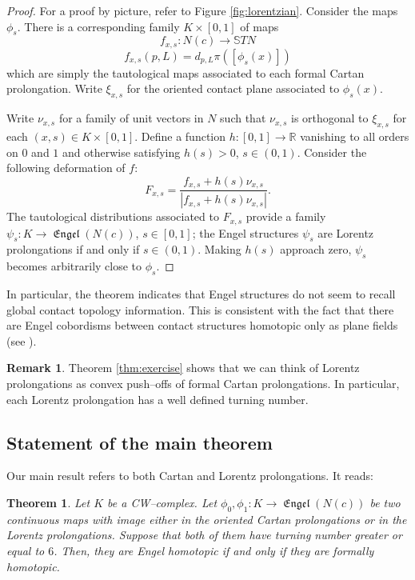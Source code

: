 \documentclass[10pt]{amsart}
\newcommand{\Engel}{\operatorname{\mathfrak{Engel}}}
\newcommand{\R}{{\mathbb{R}}}
\newtheorem{theorem}{Theorem}
\theoremstyle{definition}
\newtheorem{remark}{Remark}
\begin{document}
\begin{proof}
For a proof by picture, refer to Figure \ref{fig:lorentzian}. Consider the maps $\phi_s$. There is a corresponding family $K \times [0,1]$ of maps 
\[ f_{x,s}: N(c) \to \mathbb{S}TN \]
\[ f_{x,s}(p,L) = d_{p,L}\pi([\phi_s(x)]) \]
which are simply the tautological maps associated to each formal Cartan prolongation. Write $\xi_{x,s}$ for the oriented contact plane associated to $\phi_s(x)$.

Write $\nu_{x,s}$ for a family of unit vectors in $N$ such that $\nu_{x,s}$ is orthogonal to $\xi_{x,s}$ for each $(x,s) \in K \times [0,1]$. Define a function $h: [0,1] \to \R$ vanishing to all orders on $0$ and $1$ and otherwise satisfying $h(s) > 0$, $s \in (0,1)$. Consider the following deformation of $f$:
\[ F_{x,s} = \dfrac{f_{x,s} + h(s)\nu_{x,s}}{|f_{x,s} + h(s)\nu_{x,s}|}. \]
The tautological distributions associated to $F_{x,s}$ provide a family $\psi_s:K \to \Engel(N(c))$, $s \in [0,1]$; the Engel structures $\psi_s$ are Lorentz prolongations if and only if $s \in (0,1)$. Making $h(s)$ approach zero, $\psi_s$ becomes arbitrarily close to $\phi_s$.
\end{proof}

In particular, the theorem indicates that Engel structures do not seem to recall global contact topology information. This is consistent with the fact that there are Engel cobordisms between contact structures homotopic only as plane fields (see \cite{CPPP}).

\begin{remark}
Theorem \ref{thm:exercise} shows that we can think of Lorentz prolongations as convex push--offs of formal Cartan prolongations. In particular, each Lorentz prolongation has a well defined turning number.
\end{remark}


\subsection{Statement of the main theorem} \label{ssec:main}

Our main result refers to both Cartan and Lorentz prolongations. It reads:
\begin{theorem} \label{thm:main}
Let $K$ be a CW--complex. Let $\phi_0,\phi_1: K \to \Engel(N(c))$ be two continuous maps with image either in the oriented Cartan prolongations or in the Lorentz prolongations. Suppose that both of them have turning number greater or equal to $6$. Then, they are Engel homotopic if and only if they are formally homotopic.
\end{theorem}
\end{document}
